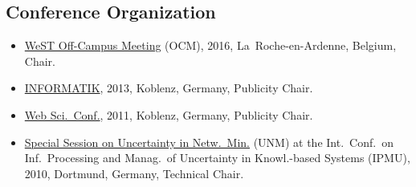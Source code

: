 \documentclass[line,mm]{res}
\newcounter{y}
\begin{document}
\begin{resume}
\section{Conference Organization}
\begin{itemize}
\item 
  \href{https://sites.google.com/site/ocm2016/}{WeST Off-Campus
  Meeting} (OCM), 2016, La~Roche-en-Ardenne, Belgium, Chair. 
\item
  \href{http://informatik2013.de/}{INFORMATIK}, 2013, Koblenz, Germany, Publicity Chair. 
\item
  \href{http://www.websci11.org/}{Web Sci.\ Conf.}, 2011, Koblenz, Germany,
  Publicity Chair.  
\item
  \href{http://www.dai-labor.de/unm2010/}{Special Session on
  Uncertainty in Netw.\ Min.} (UNM) at the Int.\ Conf.\ on Inf.\ Processing and Manag.\ of Uncertainty in Knowl.-based Systems (IPMU),
  2010, Dortmund, Germany, Technical Chair.   
\end{itemize}


\end{resume}
\end{document}
